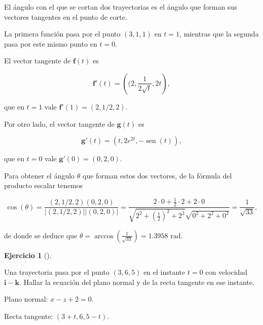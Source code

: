 \documentclass[
  a4paper,
]{scrreport}
\theoremstyle{definition}
\newtheorem{exercise}{Ejercicio}[chapter]
\theoremstyle{remark}
\begin{document}
\begin{tcolorbox}[enhanced jigsaw, coltitle=black, toptitle=1mm, colframe=quarto-callout-tip-color-frame, colbacktitle=quarto-callout-tip-color!10!white, breakable, opacityback=0, bottomtitle=1mm, opacitybacktitle=0.6, title=\textcolor{quarto-callout-tip-color}{\faLightbulb}\hspace{0.5em}{Solución}, arc=.35mm, leftrule=.75mm, toprule=.15mm, titlerule=0mm, bottomrule=.15mm, left=2mm, rightrule=.15mm, colback=white]

El ángulo con el que se cortan dos trayectorias es el ángulo que forman
sus vectores tangentes en el punto de corte.

La primera función pasa por el punto \((3,1,1)\) en \(t=1\), mientras
que la segunda pasa por este mismo punto en \(t=0\).

El vector tangente de \(\mathbf{f}(t)\) es

\[
\mathbf{f}'(t) = \left((2, \frac{1}{2\sqrt{t}}, 2t\right),
\]

que en \(t=1\) vale \(\mathbf{f}'(1) = (2,1/2,2)\).

Por otro lado, el vector tangente de \(\mathbf{g}(t)\) es

\[
\mathbf{g}'(t) = (t, 2e^{2t}, -\operatorname{sen}(t)),
\]

que en \(t=0\) vale \(\mathbf{g}'(0) = (0,2,0)\).

Para obtener el ángulo \(\theta\) que forman estos dos vectores, de la
fórmula del producto escalar tenemos

\[
\cos(\theta) 
= \frac{(2,1/2,2)(0,2,0)}{|(2,1/2,2)||(0,2,0)|}
= \frac{2\cdot 0+\frac{1}{2}\cdot 2+2\cdot 0}{\sqrt{2^2+\left(\frac{1}{2}\right)^2+2^2}\sqrt{0^2+2^2+0^2}}
= \frac{1}{\sqrt{33}},
\]

de donde se deduce que
\(\theta = \operatorname{arccos}(\frac{1}{\sqrt{33}}) = 1.3958\) rad.

\end{tcolorbox}

\begin{exercise}[]\protect\hypertarget{exr-plano-normal-trayectoria}{}\label{exr-plano-normal-trayectoria}

Una trayectoria pasa por el punto \((3,6,5)\) en el instante \(t=0\) con
velocidad \(\mathbf{i}-\mathbf{k}\). Hallar la ecuación del plano normal
y de la recta tangente en ese instante.

\end{exercise}

\begin{tcolorbox}[enhanced jigsaw, coltitle=black, toptitle=1mm, colframe=quarto-callout-tip-color-frame, colbacktitle=quarto-callout-tip-color!10!white, breakable, opacityback=0, bottomtitle=1mm, opacitybacktitle=0.6, title=\textcolor{quarto-callout-tip-color}{\faLightbulb}\hspace{0.5em}{Solución}, arc=.35mm, leftrule=.75mm, toprule=.15mm, titlerule=0mm, bottomrule=.15mm, left=2mm, rightrule=.15mm, colback=white]

Plano normal: \(x-z+2=0\).

Recta tangente: \((3+t,6,5-t)\).

\end{tcolorbox}
\end{document}
